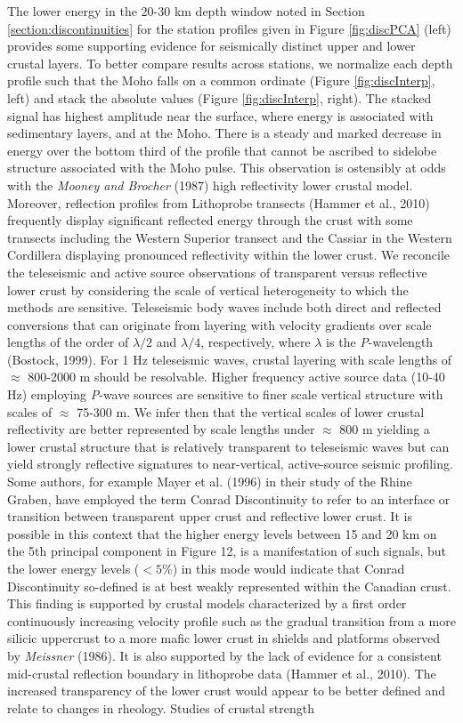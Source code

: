 \documentclass[review]{elsarticle}
\begin{document}
The lower energy in the 20-30 km depth window noted in Section \ref{section:discontinuities} for the station profiles given in Figure \ref{fig:discPCA} (left) provides some supporting evidence for seismically distinct upper and lower crustal layers. To better compare results across stations, we normalize each depth profile such that the Moho falls on a common ordinate (Figure \ref{fig:discInterp}, left) and stack the absolute values (Figure \ref{fig:discInterp}, right). The stacked signal has highest amplitude near the surface, where energy is associated with sedimentary layers, and at the Moho. There is a steady and marked decrease in energy over the bottom third of the profile that cannot be ascribed to sidelobe structure associated with the Moho pulse. This observation is ostensibly at odds with the {\it Mooney and Brocher} (1987) high reflectivity lower crustal model. Moreover, reflection profiles from {\sc Lithoprobe} transects (Hammer et al., 2010) frequently display significant reflected energy through the crust with some transects including the Western Superior transect and the Cassiar in the Western Cordillera displaying pronounced reflectivity within the lower crust. We reconcile the teleseismic and active source observations of transparent versus reflective lower crust by considering the scale of vertical heterogeneity to which the methods are sensitive. Teleseismic body waves include both direct and reflected conversions that can originate from layering with velocity gradients over scale lengths of the order of $\lambda/2$ and $\lambda/4$, respectively, where $\lambda$ is the {\it P}-wavelength (Bostock, 1999). For 1 Hz teleseismic waves, crustal layering with scale lengths of $\approx$ 800-2000 m should be resolvable. Higher frequency active source data (10-40 Hz) employing {\it P}-wave sources are sensitive to finer scale vertical structure with scales of $\approx$ 75-300 m. We infer then that the vertical scales of lower crustal reflectivity are better represented by scale lengths under $\approx$ 800 m yielding a lower crustal structure that is relatively transparent to teleseismic waves but can yield strongly reflective signatures to near-vertical, active-source seismic profiling.  Some authors, for example Mayer et al. (1996) in their study of the Rhine Graben, have employed the term Conrad Discontinuity to refer to an interface or transition between transparent upper crust and reflective lower crust. It is possible in this context that the higher energy levels between 15 and 20 km on the 5th principal component in Figure 12, is a manifestation of such signals, but the lower energy levels ($<5\%$) in this mode would indicate that Conrad Discontinuity so-defined is at best weakly represented within the Canadian crust. This finding is supported by crustal models characterized by a first order continuously increasing velocity profile such as the gradual transition from a more silicic uppercrust to a more mafic lower crust in shields and platforms observed by {\it Meissner} (1986). It is also supported by the lack of evidence for a consistent mid-crustal reflection boundary in lithoprobe data (Hammer et al., 2010). The increased transparency of the lower crust would appear to be better defined and relate to changes in rheology. Studies of crustal strength 
\end{document}
